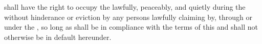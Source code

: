 \lessee shall have the right to occupy the \premises lawfully, peaceably, and quietly during the \termOfLease without hinderance or eviction by any persons lawfully claiming by, through or under the \lessor, so long as \lessee shall be in compliance with the terms of this \lease and shall not otherwise be in default hereunder.
